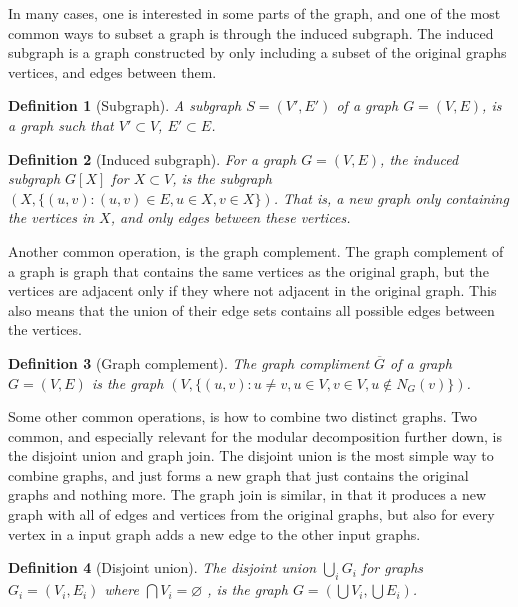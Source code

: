 \documentclass{amsart}
\newtheorem{definition}{Definition}[section]
\begin{document}
In many cases, one is interested in some parts of the graph, and one of the
most common ways to subset a graph is through the induced subgraph. The induced
subgraph is a graph constructed by only including a subset of the original
graphs vertices, and edges between them.

\begin{definition}[Subgraph]
    A subgraph $S = (V',E')$ of a graph $G = (V,E)$, is a graph such that
    $V' \subset V$, $E' \subset E$.
\end{definition}

\begin{definition}[Induced subgraph]
    
    For a graph $G = (V,E)$, the induced subgraph $G[X]$ for $X \subset V$, is
    the subgraph $(X,\{(u,v) : (u,v) \in E, u \in X,v \in X\})$. That
    is, a new graph only containing the vertices in $X$, and only edges between
    these vertices.

\end{definition}

Another common operation, is the graph complement. The graph complement of a
graph is graph that contains the same vertices as the original graph, but the
vertices are adjacent only if they where not adjacent in the original graph.
This also means that the union of their edge sets contains all possible edges
between the vertices.

\begin{definition}[Graph complement]
    The graph compliment $\overline{G}$ of a graph $G = (V,E)$ is the graph 
    $(V,\{ (u,v) : u \neq v, u \in V,v \in V, u \notin N_G(v) \})$.
\end{definition}

Some other common operations, is how to combine two distinct graphs. Two common,
and especially relevant for the modular decomposition further down, is the
disjoint union and graph join. The disjoint union is the most simple way to
combine graphs, and just forms a new graph that just contains the original graphs
and nothing more. 
The graph join is similar, in that it produces a new graph with all of edges
and vertices from the original graphs, but also for every vertex in a
input graph adds a new edge to the other input graphs.

\begin{definition}[Disjoint union]
    The disjoint union $\bigcup_i G_i$ for graphs $G_i = (V_i,E_i)$ where 
    $\bigcap V_i = \varnothing $ , is the graph
    $G = \left( \bigcup V_i,\bigcup E_i \right)$.
\end{definition}
\end{document}
